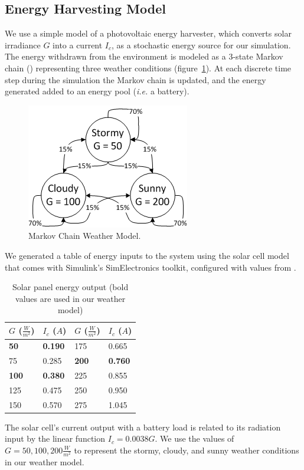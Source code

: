 \subsection{Energy Harvesting Model}
We use a simple model of a photovoltaic energy harvester, which converts solar irradiance $G$ into a current $I_c$, as a stochastic energy source for our simulation.  The energy withdrawn from the environment is modeled as a 3-state Markov chain (\cite{poggi2000stochastic,moser2007real}) representing three weather conditions (figure~\ref{fig:markov}).  At each discrete time step during the simulation the Markov chain is updated, and the energy generated added to an energy pool (\emph{i.e.} a battery).
\begin{figure}[htb]
\begin{center}
\label{fig:markov}
\caption{Markov Chain Weather Model.}
\includegraphics[scale=0.8]{markov.png}
\end{center}
\end{figure}
We generated a table of energy inputs to the system using the solar cell model that comes with Simulink's SimElectronics toolkit, configured with values from \cite{gonzalez2006model}.  
\begin{table}[h]
\begin{center}
\begin{tabular}{| l | l || l | l |}
\hline
\textbf{$G$ ($\frac{W}{m^2}$)} & \textbf{$I_c$ ($A$)} & \textbf{$G$ ($\frac{W}{m^2}$)} & \textbf{$I_c$ ($A$)} \\
\hline
\textbf{50} & \textbf{0.190} & 175 & 0.665 \\
75 & 0.285 & \textbf{200} & \textbf{0.760} \\
\textbf{100} & \textbf{0.380} & 225 & 0.855 \\
125 & 0.475 & 250 & 0.950 \\
150 & 0.570 & 275 & 1.045 \\
\hline
\end{tabular}
\end{center}
\label{tab:radiance}
\caption{Solar panel energy output (bold values are used in our weather model)}
\end{table}
The solar cell's current output with a battery load is related to its radiation input by the linear function $I_c = 0.0038G$.  We use the values of $G = 50, 100, 200 \frac{W}{m^2}$ to represent the stormy, cloudy, and sunny weather conditions in our weather model.

